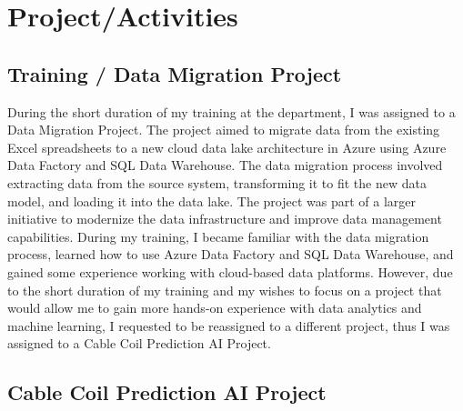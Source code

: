 \chapter{Project/Activities}
\label{ch:project}

\section{Training / Data Migration Project}

During the short duration of my training at the department, I was assigned to
a Data Migration Project. The project aimed to migrate data
from the existing Excel spreadsheets to a new cloud data lake architecture in
Azure using Azure Data Factory and SQL Data Warehouse. The data migration
process involved extracting data from the source system, transforming it to fit
the new data model, and loading it into the data lake. The project was part of
a larger initiative to modernize the data infrastructure and improve data
management capabilities. During my training, I became familiar with the data
migration process, learned how to use Azure Data Factory and SQL Data
Warehouse, and gained some experience working with cloud-based data platforms.
However, due to the short duration of my training and my wishes to focus on a
project that would allow me to gain more hands-on experience with data
analytics and machine learning, I requested to be reassigned to a different
project, thus I was assigned to a Cable Coil Prediction AI Project.

\section{Cable Coil Prediction AI Project}

